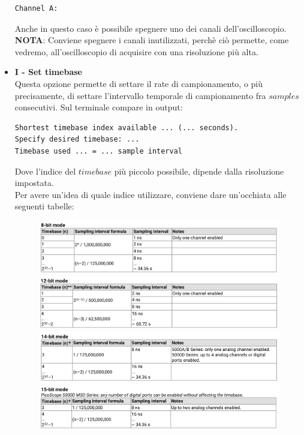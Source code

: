 \documentclass[a4paper]{article}
\begin{document}
\begin{itemize}
\begin{tcolorbox}
\begin{Verbatim}[tabsize = 4]
Channel A:
\end{Verbatim}
\end{tcolorbox}
Anche in questo caso è possibile spegnere uno dei canali dell'oscilloscopio.\\
\noindent \textbf{NOTA}: Conviene spegnere i canali inutilizzati, perchè ciò permette, come vedremo, all'oscilloscopio di acquisire con una risoluzione più alta.
\item \textbf{I - Set timebase}\\
Questa opzione permette di settare il rate di campionamento, o più precisamente, di settare l'intervallo temporale di campionamento fra $samples$ consecutivi. Sul terminale compare in output:
\begin{tcolorbox}
\begin{Verbatim}[tabsize = 4]
Shortest timebase index available ... (... seconds).
Specify desired timebase: ...
Timebase used ... = ... sample interval
\end{Verbatim}
\end{tcolorbox}
Dove l'indice del $timebase$ più piccolo possibile, dipende dalla risoluzione impostata.\\
Per avere un'idea di quale indice utilizzare, conviene dare un'occhiata alle seguenti tabelle:
\begin{figure}[h!]
\centering
\includegraphics[scale=0.3]{Immagini/8_time.png}
\includegraphics[scale=0.3]{Immagini/12_time.png}
\includegraphics[scale=0.3]{Immagini/14_time.png}
\includegraphics[scale=0.3]{Immagini/15_time.png}

\end{figure}
\end{itemize}
\end{document}
